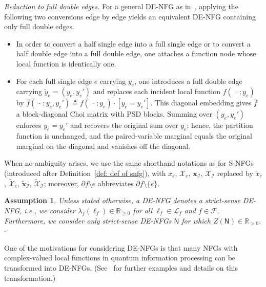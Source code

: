 \documentclass[journal]{IEEEtran}
\newcommand{\add}[1]{{\color{black}#1}}
\newtheorem{assumption}[theorem]{Assumption}
\newcommand{\manualendsymbol}[1]{%
  \leavevmode\unskip\penalty9999\hbox{}\nobreak\hfill
  \quad\hbox{#1}}
\newcommand{\eassumption}{\manualendsymbol{\ensuremath{\square}}}
\newcommand{\vect}[1]{ \bm{#1} }
\newcommand{\set}[1]{\mathcal{#1}}
\newcommand{\setF}{ \mathcal{F} }
\newcommand{\setpf}{ \partial f }
\newcommand{\sR}{\mathbb{R}}
\newcommand{\xe}{ x_{e} }
\newcommand{\setxe}{ \mathcal{X}_{e} }
\newcommand{\setx}{ \mathcal{X} }
\newcommand{\vx}{ \vect{x} }
\newcommand{\graphN}{ \mathsf{N} }
\newcommand{\defeq}{ \triangleq }
\newcommand{\sRpp}{ \mathbb{R}_{> 0} }
\newcommand{\tset}[1]{\tilde{\mathcal{#1}}}
\newcommand{\txe}{ \tilde{x}_{e} }
\newcommand{\tvx}{ \tilde{\vect{x}}  }
\newcommand*{\ie}{\textit{i.e.}}
\begin{document}
\add{\emph{Reduction to full double edges.} For a general DE-NFG as
  in~\cite{Cao2017}, applying the following two conversions edge by edge
  yields an equivalent DE-NFG containing only full double edges.
  \begin{itemize}

    \item In order to convert a half single edge into a full single edge or to
          convert a half double edge into a full double edge, one attaches a
          function node whose local function is identically one.

    \item For each full single edge $e$ carrying $y_e$, one introduces a full
          double edge carrying $\widetilde{y}_e=(y_e,y_e')$ and replaces each
          incident local function $f(\,\cdot\,;y_e)$ by
          $\widehat f(\,\cdot\,;y_e,y_e')\defeq f(\,\cdot\,;y_e) \cdot [y_e \! = \!
              y_e']$.  This diagonal embedding gives $\widehat f$ a block-diagonal Choi
          matrix with PSD blocks. Summing over $(y_e,y_e')$ enforces $y_e=y_e'$ and
          recovers the original sum over $y_e$; hence, the partition function is
          unchanged, and the paired-variable marginal equals the original marginal
          on the diagonal and vanishes off the diagonal.

  \end{itemize}}

\add{When no ambiguity arises, we use the same shorthand notations as for S-NFGs (introduced after Definition~\ref{def: def of snfg}), with $\xe$, $\setxe$, $\vx_{\set{I}}$, $\setx_{\set{I}}$ replaced by $\txe$, $\tset{X}_{e}$, $\tvx_{\set{I}}$, $\tset{X}_{\set{I}}$; moreover, $\setpf \setminus e$ abbreviates $\setpf \setminus \{e\}$.}

\begin{assumption}\label{sec:DENFG:asum:2}
  \add{Unless stated otherwise, a DE-NFG denotes} a strict-sense DE-NFG, \ie, we consider $ \lambda_{f}(\ell_{f}) \in \sR_{\geq 0} $ for all $ \ell_{f} \in \set{L}_{f} $ and $ f \in \setF $.
  \add{Furthermore, we consider only strict-sense DE-NFGs}
  $\graphN$ for which $Z(\graphN) \in \sRpp$.
  \eassumption
\end{assumption}

One of the motivations for considering DE-NFGs is that many NFGs
with complex-valued local functions in quantum information processing
can be transformed into DE-NFGs. (See~\cite{Cao2017} for further examples and details on this transformation.)
\end{document}
